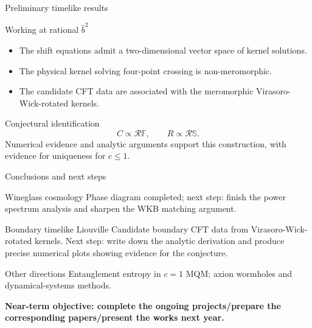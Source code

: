 \documentclass[aspectratio=169,smaller]{beamer}%
\begin{document}
\begin{frame}{Preliminary timelike results}
  \begin{block}{Working at rational $\hat b^2$}
    \begin{itemize}
      \item The shift equations admit a two-dimensional vector space of kernel solutions.
      \item The physical kernel solving four-point crossing is non-meromorphic.
      \item The candidate CFT data are associated with the meromorphic Virasoro-Wick-rotated kernels.
    \end{itemize}
  \end{block}
  \begin{block}{Conjectural identification}
    \begin{equation*}
      C\propto\mathcal{R}\mathbb{F},
      \qquad
      R\propto\mathcal{R}\mathbb{S}.
    \end{equation*}
    Numerical evidence and analytic arguments support this construction, with evidence for uniqueness for $c\leq1$.
  \end{block}
\end{frame}

\begin{frame}{Conclusions and next steps}
  \begin{block}{Wineglass cosmology}
    Phase diagram completed; next step: finish the power spectrum analysis and sharpen the WKB matching argument.
  \end{block}
  \begin{block}{Boundary timelike Liouville}
    Candidate boundary CFT data from Virasoro-Wick-rotated kernels. Next step: write down the analytic derivation and produce precise numerical plots showing evidence for the conjecture.
  \end{block}
  \begin{block}{Other directions}
    Entanglement entropy in $c=1$ MQM; axion wormholes and dynamical-systems methods.
  \end{block}
  \centering
  \textbf{Near-term objective: complete the ongoing projects/prepare the corresponding papers/present the works next year.}
\end{frame}
\end{document}
